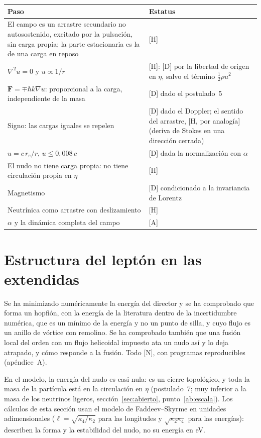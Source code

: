 \documentclass[11pt,a4paper]{article}
\newcommand{\st}[1]{\textup{[#1]}}
\newcommand{\vb}[1]{\symbf{#1}}
\begin{document}
\begin{center}
\small
\begin{tabularx}{\textwidth}{@{}Y >{\raggedright\arraybackslash}p{0.42\textwidth}@{}}
\toprule
Paso & Estatus \\
\midrule
El campo es un arrastre secundario no autosostenido, excitado por la pulsación, sin carga propia; la parte estacionaria es la de una carga en reposo & \st{H} \\
$\nabla^2u=0$ y $u\propto1/r$ & \st{H}: \st{D} por la libertad de origen en $\eta$, salvo el término $\tfrac12\rho u^2$ \\
$\vb{F}=\mp\hbar k\nabla u$: proporcional a la carga, independiente de la masa & \st{D} dado el postulado~5 \\
Signo: las cargas iguales se repelen & \st{D} dado el Doppler; el sentido del arrastre, \st{H, por analogía} (deriva de Stokes en una dirección cerrada) \\
$u=c\,r_e/r$, $u\leq0,008\,c$ & \st{D} dada la normalización con $\alpha$ \\
El nudo no tiene carga propia: no tiene circulación propia en $\eta$ & \st{H} \\
Magnetismo & \st{D} condicionado a la invariancia de Lorentz \\
Neutrínica como arrastre con deslizamiento & \st{H} \\
$\alpha$ y la dinámica completa del campo & \st{A} \\
\bottomrule
\end{tabularx}
\end{center}
\section{Estructura del leptón en las extendidas}\label{sec:extendidas}

Se ha minimizado numéricamente la energía del director y se ha comprobado que forma un hopfión, con la energía de la literatura dentro de la incertidumbre numérica, que es un mínimo de la energía y no un punto de silla, y cuyo flujo es un anillo de vórtice con remolino. Se ha comprobado también que una fusión local del orden con un flujo helicoidal impuesto ata un nudo así y lo deja atrapado, y cómo responde a la fusión. Todo \st{N}, con programas reproducibles (apéndice~A).

En el modelo, la energía del nudo es casi nula: es un cierre topológico, y toda la masa de la partícula está en la circulación en $\eta$ (postulado~7; muy inferior a la masa de los neutrinos ligeros, sección~\ref{sec:abierto}, punto~\ref{ab:escala}). Los cálculos de esta sección usan el modelo de Faddeev--Skyrme en unidades adimensionales ($\ell=\sqrt{\kappa_4/\kappa_2}$ para las longitudes y $\sqrt{\kappa_2\kappa_4}$ para las energías): describen la forma y la estabilidad del nudo, no su energía en eV.
\end{document}
